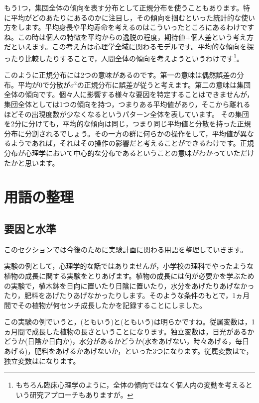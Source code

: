 \documentclass{ltjbook}
\begin{document}
もう1つ，集団全体の傾向を表す分布として正規分布を使うこともあります。特に平均がどのあたりにあるのかに注目し，その傾向を掴むといった統計的な使い方をします。平均身長や平均寿命を考えるのはこういったところにあるわけですね。この時は個人の特徴を平均からの逸脱の程度，期待値+個人差という考え方だといえます。この考え方は心理学全域に関わるモデルです。平均的な傾向を探ったり比較したりすることで，人間全体の傾向を考えようというわけです\footnote{もちろん臨床心理学のように，全体の傾向ではなく個人内の変動を考えるという研究アプローチもありますが。}。

このように正規分布には2つの意味があるのです。第一の意味は偶然誤差の分布。平均が0で分散が$\sigma^2$の正規分布に誤差が従うと考えます。第二の意味は集団全体の傾向です。個々人に影響する様々な要因を特定することはできませんが，集団全体としては1つの傾向を持つ，つまりある平均値があり，そこから離れるほどその出現度数が少なくなるというパターン全体を表しています。
その集団を2分に分けても，平均的な傾向は同じ，つまり同じ平均値と分散を持った正規分布に分割されるでしょう。その一方の群に何らかの操作をして，平均値が異なるようであれば，それはその操作の影響だと考えることができるわけです。正規分布が心理学において中心的な分布であるということの意味がわかっていただけたかと思います。

\section{用語の整理}
\subsection{要因と水準}

このセクションでは今後のために実験計画に関わる用語を整理していきます。

実験の例として，心理学的な話ではありませんが，小学校の理科でやったような植物の成長に関する実験をとりあげます。植物の成長には何が必要かを学ぶための実験で，植木鉢を日向に置いたり日陰に置いたり，水分をあげたりあげなかったり，肥料をあげたりあげなかったりします。そのような条件のもとで，1ヵ月間でその植物が何センチ成長したかを記録することにしました。


この実験の例でいうと，(ともいう)と(ともいう)は明らかですね。従属変数は，1ヵ月間で成長した植物の長さということになります。独立変数は，日光があるかどうか(日陰か日向か)，水分があるかどうか(水をあげない，時々あげる，毎日あげる)，肥料をあげるかあげないか，といった3つになります。従属変数はで，独立変数はになります。
\end{document}
